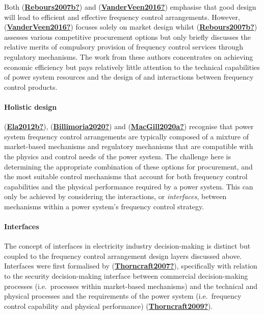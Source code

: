 \documentclass[12pt,a4paper,]{report}
\begin{document}
Both (\protect\hyperlink{ref-Rebours2007b}{\textbf{Rebours2007b?}}) and
(\protect\hyperlink{ref-VanderVeen2016}{\textbf{VanderVeen2016?}})
emphasise that good design will lead to efficient and effective
frequency control arrangements. However,
(\protect\hyperlink{ref-VanderVeen2016}{\textbf{VanderVeen2016?}})
focuses solely on market design whilst
(\protect\hyperlink{ref-Rebours2007b}{\textbf{Rebours2007b?}}) assesses
various competitive procurement options but only briefly discusses the
relative merits of compulsory provision of frequency control services
through regulatory mechanisms. The work from these authors concentrates
on achieving economic efficiency but pays relatively little attention to
the technical capabilities of power system resources and the design of
and interactions between frequency control products.

\hypertarget{holistic-design}{%
\paragraph{Holistic design}\label{holistic-design}}

(\protect\hyperlink{ref-Ela2012b}{\textbf{Ela2012b?}}),
(\protect\hyperlink{ref-Billimoria2020}{\textbf{Billimoria2020?}}) and
(\protect\hyperlink{ref-MacGill2020a}{\textbf{MacGill2020a?}}) recognise
that power system frequency control arrangements are typically composed
of a mixture of market-based mechanisms and regulatory mechanisms that
are compatible with the physics and control needs of the power system.
The challenge here is determining the appropriate combination of these
options for procurement, and the most suitable control mechanisms that
account for both frequency control capabilities and the physical
performance required by a power system. This can only be achieved by
considering the interactions, or \emph{interfaces}, between mechanisms
within a power system's frequency control strategy.

\hypertarget{interfaces}{%
\paragraph{Interfaces}\label{interfaces}}

The concept of interfaces in electricity industry decision-making is
distinct but coupled to the frequency control arrangement design layers
discussed above. Interfaces were first formalised by
(\protect\hyperlink{ref-Thorncraft2007}{\textbf{Thorncraft2007?}}),
specifically with relation to the security decision-making interface
between commercial decision-making processes (i.e.~processes within
market-based mechanisms) and the technical and physical processes and
the requirements of the power system (i.e.~frequency control capability
and physical performance)
(\protect\hyperlink{ref-Thorncraft2009}{\textbf{Thorncraft2009?}}).
\end{document}

